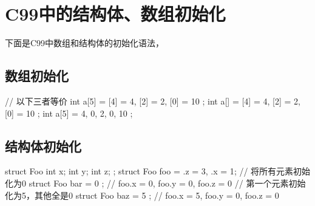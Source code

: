 \section[Initialize struct and array in C99]{C99中的结构体、数组初始化}
下面是C99中数组和结构体的初始化语法，

\subsection[Initialize array]{数组初始化}
\begin{cppcode}
  // 以下三者等价
  int a[5] = { [4] = 4, [2] = 2, [0] = 10 };
  int a[]  = { [4] = 4, [2] = 2, [0] = 10 };
  int a[5] = { 4, 0, 2, 0, 10 };
\end{cppcode}

\subsection[Initialzie struct]{结构体初始化}
\begin{cppcode}
  struct Foo {
    int x;
    int y;
    int z;
  };
  struct Foo foo = {.z = 3, .x = 1};
  // 将所有元素初始化为0
  struct Foo bar = { 0 }; // foo.x = 0, foo.y = 0, foo.z = 0
  // 第一个元素初始化为5，其他全是0
  struct Foo baz = { 5 }; // foo.x = 5, foo.y = 0, foo.z = 0
\end{cppcode}